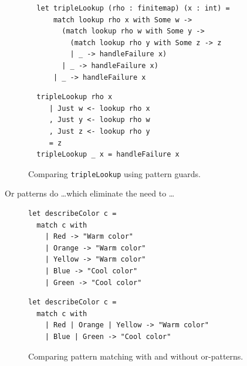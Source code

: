 \documentclass[article,screen,12pt, nonacm]{acmart}
\begin{document}
\begin{figure}[ht]
\centering
\begin{minipage}{0.47\linewidth}
\small
\begin{verbatim}
  let tripleLookup (rho : finitemap) (x : int) =
      match lookup rho x with Some w -> 
        (match lookup rho w with Some y -> 
          (match lookup rho y with Some z -> z
          | _ -> handleFailure x)
        | _ -> handleFailure x)
      | _ -> handleFailure x
\end{verbatim}
\caption*{OCaml version with nested pattern matching}
\end{minipage}
\hfill
\begin{minipage}{0.47\linewidth}
\small
\begin{verbatim}
  tripleLookup rho x
     | Just w <- lookup rho x
     , Just y <- lookup rho w
     , Just z <- lookup rho y
     = z
  tripleLookup _ x = handleFailure x
\end{verbatim}
\caption*{Haskell version with pattern guards}
\end{minipage}
\caption{Comparing \texttt{tripleLookup} using pattern guards.}
\label{fig:pmtriplelookup}
\end{figure}
\label{fig:guardtriplelookup}

    Or patterns do \dots which eliminate the need to \dots

     \begin{figure}[h]
\centering
\begin{minipage}{0.45\linewidth}
\small
\begin{verbatim}
let describeColor c =
  match c with
    | Red -> "Warm color"
    | Orange -> "Warm color"
    | Yellow -> "Warm color"
    | Blue -> "Cool color"
    | Green -> "Cool color"
\end{verbatim}
\caption*{Without extensions}
\end{minipage}
\hfill
\begin{minipage}{0.45\linewidth}
\small
\begin{verbatim}
let describeColor c =
  match c with
    | Red | Orange | Yellow -> "Warm color"
    | Blue | Green -> "Cool color"
\end{verbatim}
\caption*{With or-patterns}
\end{minipage}
\caption{Comparing pattern matching with and without or-patterns.}
\end{figure}
\end{document}
